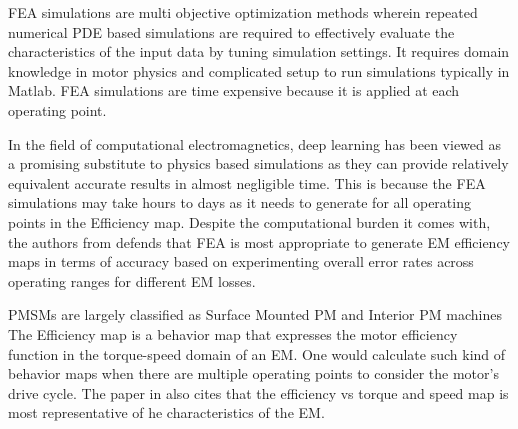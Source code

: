 \documentclass{report} %
\begin{document}
\ac{FEA} simulations are multi objective optimization methods wherein repeated numerical \ac{PDE} based simulations 
are required to effectively evaluate the characteristics of the input data by tuning simulation settings. 
It requires domain knowledge in motor physics and complicated setup to run simulations typically in Matlab.
\ac{FEA} simulations are time expensive because it is applied at each operating point.

In the field of computational electromagnetics, deep learning has been viewed as a promising substitute to physics based simulations as they can
provide relatively equivalent accurate results in almost negligible time. 
This is because the \ac{FEA} simulations may take hours to days as it needs to generate for all operating points in the Efficiency map.
Despite the computational burden it comes with, the authors from \cite{FEA-ETA-2017} defends that \ac{FEA} is most appropriate to 
generate \ac{EM} efficiency maps in terms of accuracy based on experimenting overall error rates across operating ranges for different \ac{EM} losses.

PMSMs are largely classified as Surface Mounted PM and Interior PM machines
The Efficiency map is a behavior map that expresses the motor efficiency function in the torque-speed domain of an \ac{EM}.
One would calculate such kind of behavior maps when there are multiple operating points to consider the motor's drive cycle.
The paper in \cite{ETA-2021} also cites that the efficiency vs torque and speed map is most representative of he characteristics of the \ac{EM}. 
\end{document}
